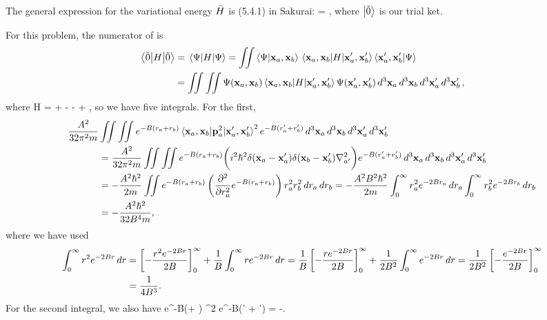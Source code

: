 \begin{solution}
	The general expression for the variational energy $\bar{H}$ is (5.4.1) in Sakurai:
	\beqn \label{Hbar}
		\Hbar = ,
	\eeqn
	where $\ket{\tilde{0}}$ is our trial ket.
	
	For this problem, the numerator of  is
	\begin{align*}
		\ev{H}{\ot} &= \ev{H}{\Psi}
		= \iint \braket{\Psi}{\vxa, \vxb} \mel{\vxa, \vxb}{H}{\vxa', \vxb'} \braket{\vxa', \vxb'}{\Psi} \\
		&= \iint \iint \Psi(\vxa, \vxb) \mel{\vxa, \vxb}{H}{\vxa', \vxb'} \Psi(\vxa', \vxb') \dcxa \dcxb \dcxap \dcxbp,
	\end{align*}
	where
	\beq
		H =  +  -  -  + ,
	\eeq
	so we have five integrals.  For the first,
	\begin{align*}
		\frac{A^2}{32 \pi^2 m} &\iint \iint e^{-B(\ra + \rb)} \mel{\vxa, \vxb}{\vpa^2}{\vxa', \vxb'}^2 e^{-B(\ra' + \rb')} \dcxa \dcxb \dcxap \dcxbp \\
		&= \frac{A^2}{32 \pi^2 m} \iint \iint e^{-B(\ra + \rb)} \bigg( i^2 \hbar^2 \delta(\vxa - \vxa') \delta(\vxb - \vxb') \laplacian_{a'} \bigg) e^{-B(\ra' + \rb')} \dcxa \dcxb \dcxap \dcxbp \\
		&= -\frac{A^2 \hbar^2}{2 m} \iint e^{-B(\ra + \rb)} \left( \pdv[2]{}{\ra} e^{-B(\ra + \rb)} \right) \ra^2 \rb^2 \dra \drb
		= -\frac{A^2 B^2 \hbar^2}{2 m} \intoi \ra^2 e^{-2 B \ra} \dra \intoi \rb^2 e^{-2 B \rb} \drb \\
		&= -\frac{A^2 \hbar^2}{32 B^4 m},
	\end{align*}
	where we have used
	\begin{align*}
		\int_0^\infty r^2 e^{-2B r} \dd{r} &= \left[ -\frac{r^2 e^{-2 B r}}{2 B} \right]_0^\infty + \frac{1}{B} \int_0^\infty r e^{-2 B r} \dd{r}
		= \frac{1}{B} \left[ -\frac{r e^{-2 B r}}{2 B} \right]_0^\infty + \frac{1}{2 B^2} \int_0^\infty e^{-2 B r} \dd{r}
		= \frac{1}{2 B^2} \left[ -\frac{e^{-2 B r}}{2 B} \right]_0^\infty \\
		&= \frac{1}{4 B^3}.
	\end{align*}
	For the second integral, we also have
	\beq
		  \iint \iint e^{-B(\ra + \rb)} ^2 e^{-B(\ra' + \rb')} \dcxa \dcxb \dcxap \dcxbp = -.
	\eeq
	

\end{solution}
